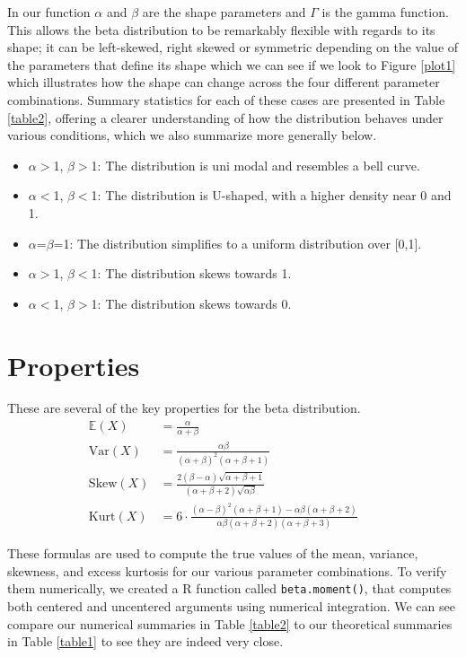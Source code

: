 \documentclass{article}\usepackage[]{graphicx}\usepackage[]{xcolor}
\begin{document}
\begin{multicols}{2}
In our function $\alpha$ and $\beta$ are the shape parameters and $\Gamma$ is the gamma function. This allows the beta distribution to be remarkably flexible with regards to its shape; it can be left-skewed, right skewed or symmetric depending on the value of the parameters that define its shape which we can see if we look to Figure \ref{plot1} which illustrates how the shape can change across the four different parameter combinations. Summary statistics for each of these cases are presented in Table \ref{table2}, offering a clearer understanding of how the distribution behaves under various conditions, which we also summarize more generally below. 
\begin{itemize}
\item $\alpha$$>$1, $\beta$$>$1: The distribution is uni modal and resembles a bell curve.
\item $\alpha$$<$1, $\beta$$<$1: The distribution is U-shaped, with a higher density near 0 and 1.
\item $\alpha$=$\beta$=1: The distribution simplifies to a uniform distribution over [0,1].
\item $\alpha$$>$1, $\beta$$<$1: The distribution skews towards 1.
\item $\alpha$$<$1, $\beta$$>$1: The distribution skews towards 0.
\end{itemize}


\section{Properties}
These are several of the key properties for the beta distribution.
\begin{align}
\mathbb{E}(X) &= \frac{\alpha}{\alpha + \beta} && \tag{Mean} \\
\text{Var}(X) &= \frac{\alpha \beta}{(\alpha + \beta)^2(\alpha + \beta + 1)} && \tag{Variance}  \\
\text{Skew}(X) &= \frac{2(\beta - \alpha)\sqrt{\alpha + \beta + 1}}{(\alpha + \beta + 2)\sqrt{\alpha \beta}} && \tag{Skewness} \\
\text{Kurt}(X) &= 6 \cdot \frac{(\alpha - \beta)^2(\alpha + \beta + 1) - \alpha \beta (\alpha + \beta + 2)}{\alpha \beta (\alpha + \beta + 2)(\alpha + \beta + 3)} && \tag{Excess Kurtosis}
\end{align}

These formulas are used to compute the true values of the mean, variance, skewness, and excess kurtosis for our various parameter combinations. To verify them numerically, we created a R function called \verb|beta.moment()|, that computes both centered and uncentered arguments using numerical integration. We can see compare our numerical summaries in Table \ref{table2} to our theoretical summaries in Table \ref{table1} to see they are indeed very close.


\end{multicols}
\end{document}
